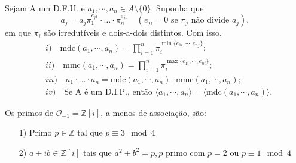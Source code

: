 \documentclass[algebraII_notes.tex]{subfiles}
\begin{document}
\begin{theorem*}[Exercício]
	Sejam A um D.F.U. e \(a_{1}, \cdots, a_{n}\in A\setminus{\{0\}}.\) Suponha que
	\[
		a_{j} = a_{j}\pi_{1}^{e_{j1}}\cdot\dotsc \cdot \pi_{n}^{e_{jn}} \quad (e_{ji} = 0 \text{ se } \pi_{j} \text{ não divide } a_{j}),
	\]
	em que \(\pi_{i}\) são irredutíveis e dois-a-dois distintos. Com isso,
	\begin{align*}
		 & i)\quad\mathrm{mdc}(a_{1},\cdots,a_{n}) = \prod\limits_{i=1}^{n}\pi_{i}^{\min\{e_{1i}, \cdots, e_{nj}\}};                            \\
		 & ii)\quad \mathrm{mmc}(a_{1}, \cdots, a_{n}) = \prod\limits_{i=1}^{n}\pi_{i}^{\max\{e_{1i}, \cdots, e_{ni}\}};                        \\
		 & iii)\quad a_{1}\cdot \dotsc \cdot  a_{n} = \mathrm{mdc}(a_{1}, \cdots, a_{n})\cdot \mathrm{mmc}(a_{1}, \cdots, a_{n});               \\
		 & iv)\quad \text{Se A é um D.I.P., então }  \langle a_{1}, \cdots, a_{n} \rangle = \langle \mathrm{mdc}(a_{1}, \cdots, a_{n}) \rangle.
	\end{align*}
\end{theorem*}
\begin{prop*}
	Os primos de \(\mathcal{O}_{-1} = \mathbb{Z}[i]\), a menos de associação, são:
	\begin{itemize}
		\item[1)] Primo \(p\in \mathbb{Z}\) tal que \(p\equiv 3 \mod 4\)
		\item[2)] \(a+ib\in \mathbb{Z}[i]\) tais que \(a^{2} + b^{2} = p, p\) primo com \(p = 2\) ou \(p\equiv 1 \mod 4\)
	\end{itemize}
\end{prop*}
\end{document}
